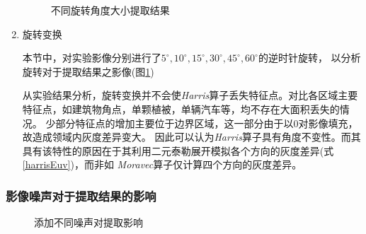 \begin{enumerate}
        \begin{figure}[H]
            \centering
            \caption{不同旋转角度大小提取结果}
            \label{harris_rotate}
        \end{figure}


        \item 旋转变换
        
        \hspace{20pt}本节中，对实验影像分别进行了$5^\circ , 10^\circ , 15^\circ , 30^\circ , 45^\circ , 60^\circ$的逆时针旋转，
        以分析旋转对于提取结果之影像(图\ref{harris_rotate})

        \hspace{20pt}从实验结果分析，旋转变换并不会使\textit{Harris}算子丢失特征点。对比各区域主要特征点，如建筑物角点，单颗植被，单辆汽车等，均不存在大面积丢失的情况。
        少部分特征点的增加主要位于边界区域，这一部分由于以0对影像填充，故造成领域内灰度差异变大。
        因此可以认为\textit{Harris}算子具有角度不变性。而其具有该特性的原因在于其利用二元泰勒展开模拟各个方向的灰度差异(式\ref{harrisEuv})，而非如
        \textit{Moravec}算子仅计算四个方向的灰度差异。

    \end{enumerate}

    \subsubsection{影像噪声对于提取结果的影响}

    \begin{figure}[H]
        \centering
        \caption{添加不同噪声对提取影响}
        \label{harris_noise}
    \end{figure}

